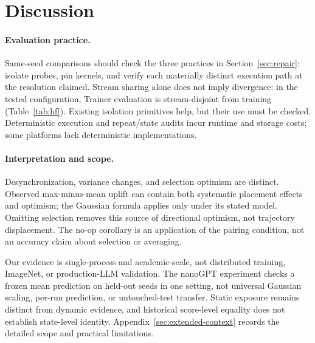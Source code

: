 \section{Discussion}
\label{sec:discussion}

\paragraph{Evaluation practice.}
Same-seed comparisons should check the three practices in
Section~\ref{sec:repair}: isolate probes, pin kernels, and verify each
materially distinct execution path at the resolution claimed.
Stream sharing alone does not imply divergence: in the tested configuration,
Trainer evaluation is stream-disjoint from training
(Table~\ref{tab:hf}). Existing isolation primitives help, but their use must
be checked. Deterministic execution and repeat/state audits incur runtime
and storage costs; some platforms lack deterministic implementations.

\paragraph{Interpretation and scope.}
Desynchronization, variance changes, and selection optimism are distinct.
Observed max-minus-mean uplift can contain both systematic placement
effects and optimism; the Gaussian formula applies only under its stated
model. Omitting selection removes this source of directional optimism,
not trajectory displacement. The no-op corollary is an application of the
pairing condition, not an accuracy claim about selection or averaging.

Our evidence is single-process and academic-scale, not distributed training,
ImageNet, or production-LLM validation. The nanoGPT experiment checks a
frozen mean prediction on held-out seeds in one setting, not universal
Gaussian scaling, per-run prediction, or untouched-test transfer.
Static exposure remains distinct from dynamic evidence, and historical
score-level equality does not establish state-level identity.
Appendix~\ref{sec:extended-context} records the detailed scope and practical
limitations.
